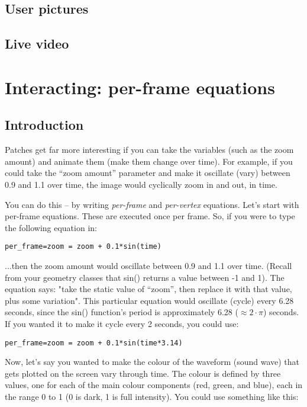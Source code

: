 \documentclass[11pt, a5paper, pagesize]{scrbook}
\begin{document}
\subsection{User pictures}

\subsection{Live video}

\section{Interacting: per-frame equations}
\subsection{Introduction}
Patches get far more interesting if you can take the variables (such as the zoom amount) and animate them (make them change over time). For example, if you could take the ``zoom amount'' parameter and make it oscillate (vary) between 0.9 and 1.1 over time, the image would cyclically zoom in and out, in time.

You can do this -- by writing \textit{per-frame} and \textit{per-vertex} equations. Let's start with per-frame equations. These are executed once per frame. So, if you were to type the following equation in:

\begin{verbatim}
per_frame=zoom = zoom + 0.1*sin(time)
\end{verbatim}


...then the zoom amount would oscillate between 0.9 and 1.1 over time. (Recall from your geometry classes that sin() returns a value between -1 and 1). The equation says: "take the static value of ``zoom'', then replace it with that value, plus some variation". This particular equation would oscillate (cycle) every 6.28 seconds, since the sin() function's period is approximately 6.28 ($\approx 2 \cdot \pi$) seconds. If you wanted it to make it cycle every 2 seconds, you could use:

\begin{verbatim}
per_frame=zoom = zoom + 0.1*sin(time*3.14)
\end{verbatim}

Now, let's say you wanted to make the colour of the waveform (sound wave) that gets plotted on the screen vary through time. The colour is defined by three values, one for each of the main colour components (red, green, and blue), each in the range 0 to 1 (0 is dark, 1 is full intensity). You could use something like this:
\end{document}
